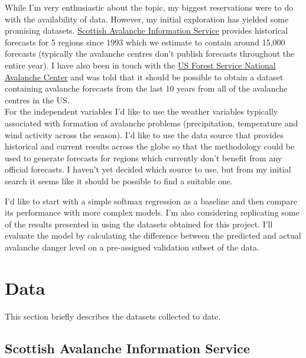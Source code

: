 \documentclass{article}
\newcommand{\sais}{Scottish Avalanche Information Service}
\begin{document}
	While I'm very enthusiastic about the topic, my biggest reservations were to do with the availability of data. However, my initial exploration has yielded some promising datasets. \href{https://www.sais.gov.uk/forecast-archive/}{Scottish Avalanche Information Service} provides historical forecasts for 5 regions since 1993 which we estimate to contain around 15,000 forecasts (typically the avalanche centres don't publish forecasts throughout the entire year). I have also been in touch with the \href{https://avalanche.org/national-avalanche-center/}{US Forest Service National Avalanche Center} and was told that it should be possible to obtain a dataset containing avalanche forecasts from the last 10 years from all of the avalanche centres in the US. \\
	For the independent variables I'd like to use the weather variables typically associated with formation of avalanche problems (precipitation, temperature and wind activity across the season). I'd like to use the data source that provides historical and current results across the globe so that the methodology could be used to generate forecasts for regions which currently don't benefit from any official forecasts. I haven't yet decided which source to use, but from my initial search it seems like it should be possible to find a suitable one.
	
	I'd like to start with a simple softmax regression as a baseline and then compare its performance with more complex models. I'm also considering replicating some of the results presented in  using the datasets obtained for this project. I'll evaluate the model by calculating the difference between the predicted and actual avalanche danger level on a pre-assigned validation subset of the data. 
	

\section{Data}

	This section briefly describes the datasets collected to date.

\subsection{\sais}
\end{document}
